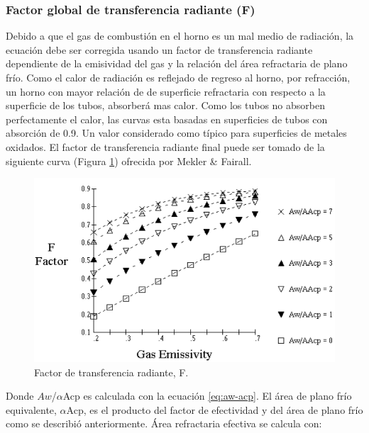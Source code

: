 \subsubsection{Factor global de transferencia radiante (F)}
\par Debido a que el gas de combustión en el horno es un mal medio de radiación, la ecuación debe ser corregida usando un factor de transferencia radiante dependiente de la emisividad del gas y la relación del área refractaria de plano frío. Como el calor de radiación es reflejado de regreso al horno, por refracción, un horno con mayor relación de de superficie refractaria con respecto a la superficie de los tubos, absorberá mas calor. Como los tubos no absorben perfectamente el calor, las curvas esta basadas en superficies de tubos con absorción de 0.9. Un valor considerado como típico para superficies de metales oxidados. El factor de transferencia radiante final puede ser tomado de la siguiente curva (Figura \ref{fig:f}) ofrecida por Mekler \& Fairall\cite{bib:mekler}.

\begin{figure}[hbt]
\begin{center}
\includegraphics[scale=0.45]{images/f}
\caption[Factor de transferencia radiante, F]{Factor de transferencia radiante, F.}
\label{fig:f}
\end{center}
\end{figure}

\par Donde $Aw$/$\alpha$Acp es calculada con la ecuación \ref{eq:aw-acp}. El área de plano frío equivalente, $\alpha$Acp, es el producto del factor de efectividad y del área de plano frío como se describió anteriormente. Área refractaria efectiva se calcula con:

